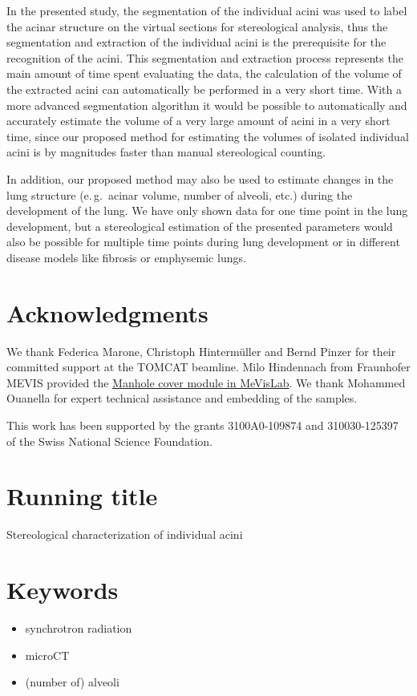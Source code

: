 \documentclass[final,paper=a4,DIV=calc,abstract,english]{scrartcl}
\newcommand{\eg}{e.\,g.\ }
\begin{document}
In the presented study, the segmentation of the individual acini was used to label the acinar structure on the virtual sections for stereological analysis, thus the segmentation and extraction of the individual acini is the prerequisite for the recognition of the acini.
This segmentation and extraction process represents the main amount of time spent evaluating the data, the calculation of the volume of the extracted acini can automatically be performed in a very short time.
With a more advanced segmentation algorithm it would be possible to automatically and accurately estimate the volume of a very large amount of acini in a very short time, since our proposed method for estimating the volumes of isolated individual acini is by magnitudes faster than manual stereological counting.

In addition, our proposed method may also be used to estimate changes in the lung structure (\eg acinar volume, number of alveoli, etc.) during the development of the lung.
We have only shown data for one time point in the lung development, but a stereological estimation of the presented parameters would also be possible for multiple time points during lung development or in different disease models like fibrosis or emphysemic lungs.

\section{Acknowledgments}
We thank Federica Marone, Christoph Hintermüller and Bernd Pinzer for their committed support at the TOMCAT beamline.
Milo Hindennach from Fraunhofer MEVIS provided the \href{http://www.mevis-research.de/cgi-bin/discus/board-auth.cgi?lm=1282233250&file=/839/11760.html}{Manhole cover module in MeVisLab}.
We thank Mohammed Ouanella for expert technical assistance and embedding of the samples.

This work has been supported by the grants 3100A0-109874 and 310030-125397 of the Swiss National Science Foundation.

\ifJCS
	\singlespacing
\else
\fi

\clearpage
\onecolumn

\section*{Running title}
Stereological characterization of individual acini

\section*{Keywords}
\begin{itemize}
	\item synchrotron radiation 
	\item microCT
	\item (number of) alveoli
\end{itemize}
\end{document}
